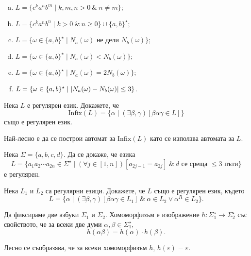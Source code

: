 \begin{problem}
\begin{enumerate}[a)]
  \item
    $L = \{c^ka^nb^m \mid k,m,n > 0\ \&\ n \neq m\}$;
  \item
    $L = \{c^ka^nb^n \mid k > 0\ \&\ n \geq 0\}\cup\{a,b\}^\star$;
  \item
    $L = \{\omega \in \{a,b\}^\star \mid N_a(\omega)\text{ не дели }N_b(\omega)\}$;
  \item
    $L = \{\omega \in \{a,b\}^\star \mid N_a(\omega) < N_b(\omega)\}$;
  \item
    $L = \{\omega \in \{a,b\}^\star \mid N_a(\omega) = 2N_b(\omega)\}$;
  \item
    $L = \{\omega \in \{a,b\}^\star \mid \lvert{N_a(\omega) - N_b(\omega)}\rvert \leq 3\}$.
  \end{enumerate}
\end{problem}

\begin{problem}
  Нека $L$ е регулярен език. Докажете, че 
  \[\text{Infix}(L) = \{\alpha \mid (\exists \beta,\gamma)[\beta\alpha\gamma \in L]\}\]
  също е регулярен език.
\end{problem}
\begin{hint}
  Най-лесно е да се построи автомат за $\text{Infix}(L)$ като се използва автомата за $L$.
\end{hint}

\begin{problem}
  Нека $\Sigma = \{a,b,c,d\}$.
  Да се докаже, че езика 
  \[L = \{a_1a_2\cdots a_{2n} \in \Sigma^\star \mid (\forall j \in [1,n])[a_{2j-1} = a_{2j}]\ \&\ d\text{ се среща $\leq 3$ пъти}\}\]
  е регулярен.
\end{problem}

\begin{problem}
  Нека $L_1$ и $L_2$ са регулярни езици. Докажете, че $L$ също е регулярен език, където
  \[L = \{\alpha \mid (\exists \beta,\gamma)[\beta\alpha\gamma \in L_1]\ \&\ \alpha \in L_2 \vee \alpha^R \in L_2\}.\]
\end{problem}

\begin{dfn}
  Да фиксираме две азбуки $\Sigma_1$ и $\Sigma_2$.
  Хомоморфизъм е изображение $h:\Sigma^\star_1 \to \Sigma^\star_2$ със свойството, че
  за всеки две думи $\alpha,\beta\in\Sigma^\star_1$,
  \[h(\alpha\beta) = h(\alpha)\cdot h(\beta).\]
\end{dfn}

Лесно се съобразява, че за всеки хомоморфизъм $h$, $h(\varepsilon) = \varepsilon$.

